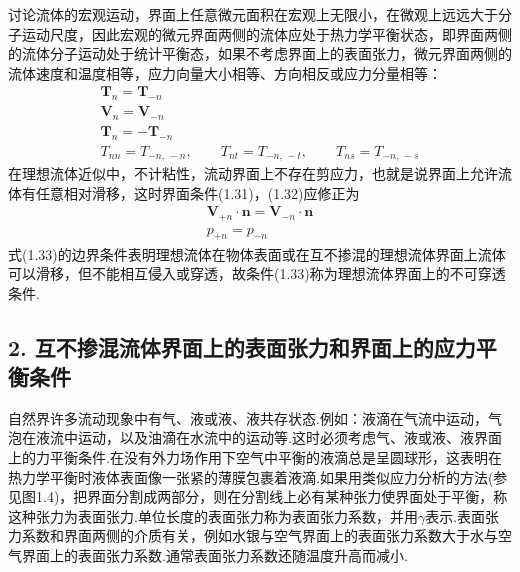 讨论流体的宏观运动，界面上任意微元面积在宏观上无限小，在微观上远远大于分子运动尺度，因此宏观的微元界面两侧的流体应处于热力学平衡状态，即界面两侧的流体分子运动处于统计平衡态，如果不考虑界面上的表面张力，微元界面两侧的流体速度和温度相等，应力向量大小相等、方向相反或应力分量相等：
\begin{gather*}
\boldsymbol{T}_n=\boldsymbol{T}_{-n}\tag{1.30}\\
\boldsymbol{V}_n=\boldsymbol{V}_{-n}\tag{1.31}\\
\boldsymbol{T}_n=-\boldsymbol{T}_{-n}\tag{1.32a}\\
T_{nn}=T_{-n,\,-n},\qquad T_{nt}=T_{-n,\,-t},\qquad T_{ns}=T_{-n,\,-s}\tag{1.32b}
\end{gather*}
在理想流体近似中，不计粘性，流动界面上不存在剪应力，也就是说界面上允许流体有任意相对滑移，这时界面条件(1.31)，(1.32)应修正为
\begin{gather*}
\boldsymbol{V}_{+n}\cdot\boldsymbol{n}=\boldsymbol{V}_{-n}\cdot\boldsymbol{n}\tag{1.33}\\[2pt]
p_{+n}=p_{-n}\tag{1.34}
\end{gather*}
式(1.33)的边界条件表明理想流体在物体表面或在互不掺混的理想流体界面上流体可以滑移，但不能相互侵入或穿透，故条件(1.33)称为理想流体界面上的不可穿透条件.

\subsection*{2. 互不掺混流体界面上的表面张力和界面上的应力平衡条件}

自然界许多流动现象中有气、液或液、液共存状态.例如：液滴在气流中运动，气泡在液流中运动，以及油滴在水流中的运动等.这时必须考虑气、液或液、液界面上的力平衡条件.在没有外力场作用下空气中平衡的液滴总是呈圆球形，这表明在热力学平衡时液体表面像一张紧的薄膜包裹着液滴.如果用类似应力分析的方法(参见图1.4)，把界面分割成两部分，则在分割线上必有某种张力使界面处于平衡，称这种张力为表面张力.单位长度的表面张力称为表面张力系数，并用$\gamma$表示.表面张力系数和界面两侧的介质有关，例如水银与空气界面上的表面张力系数大于水与空气界面上的表面张力系数.通常表面张力系数还随温度升高而减小.

